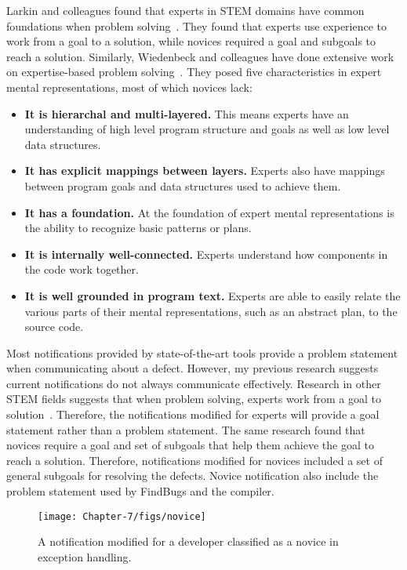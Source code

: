 Larkin and colleagues found that experts in STEM domains have common foundations when problem solving~\cite{larkin1980expert}. They found that experts use experience to work from a goal to a solution, while novices required a goal and subgoals to reach a solution. Similarly, Wiedenbeck and colleagues have done extensive work on expertise-based problem solving~\cite{wiedenbeck1985novice,Wiedenbeck:1993:Mental}. They posed five characteristics in expert mental representations, most of which novices lack:

\begin{itemize}
    \item \textbf{It is hierarchal and multi-layered.} This means experts have an understanding of high level program structure and goals as well as low level data structures.
    \item \textbf{It has explicit mappings between layers.} Experts also have mappings between program goals and data structures used to achieve them.
    \item \textbf{It has a foundation.} At the foundation of expert mental representations is the ability to recognize basic patterns or plans.
    \item \textbf{It is internally well-connected.} Experts understand how components in the code work together.
    \item \textbf{It is well grounded in program text.} Experts are able to easily relate the various parts of their mental representations, such as an abstract plan, to the source code.   
\end{itemize}


Most notifications provided by state-of-the-art tools provide a problem statement when communicating about a defect. However, my previous research suggests current notifications do not always communicate effectively.
Research in other STEM fields suggests that when problem solving, experts work from a goal to solution~\cite{larkin1980expert}. Therefore, the notifications modified for experts will provide a goal statement rather than a problem statement. The same research found that novices require a goal and set of subgoals that help them achieve the goal to reach a solution. Therefore, notifications modified for novices included a set of general subgoals for resolving the defects. Novice notification also include the problem statement used by FindBugs and the compiler.

\begin{figure}
	\centering
	\texttt{[image: Chapter-7/figs/novice]}
	\caption{A notification modified for a developer classified as a novice in  exception handling.}
	\label{fig:novice}
\end{figure}

